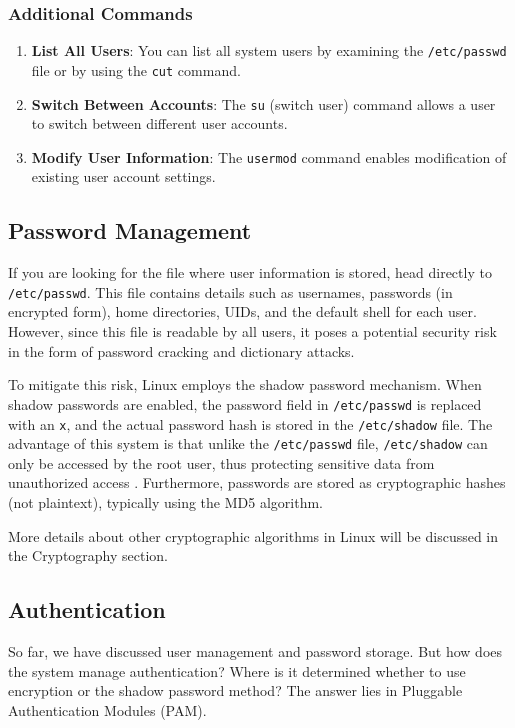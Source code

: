 \documentclass[conference]{IEEEtran}
\begin{document}
\subsubsection{Additional Commands}

\begin{enumerate}
    \item \textbf{List All Users}: You can list all system users by examining the \texttt{/etc/passwd} file or by using the \texttt{cut} command.
    \item \textbf{Switch Between Accounts}: The \texttt{su} (switch user) command allows a user to switch between different user accounts.
    \item \textbf{Modify User Information}: The \texttt{usermod} command enables modification of existing user account settings.
\end{enumerate}

\subsection{Password Management}

If you are looking for the file where user information is stored, head directly to \texttt{/etc/passwd}. This file contains details such as usernames, passwords (in encrypted form), home directories, UIDs, and the default shell for each user. However, since this file is readable by all users, it poses a potential security risk in the form of password cracking and dictionary attacks.

To mitigate this risk, Linux employs the shadow password mechanism. When shadow passwords are enabled, the password field in \texttt{/etc/passwd} is replaced with an \texttt{x}, and the actual password hash is stored in the \texttt{/etc/shadow} file. The advantage of this system is that unlike the \texttt{/etc/passwd} file, \texttt{/etc/shadow} can only be accessed by the root user, thus protecting sensitive data from unauthorized access \cite{tldp-authentication}. Furthermore, passwords are stored as cryptographic hashes (not plaintext), typically using the MD5 algorithm.

More details about other cryptographic algorithms in Linux will be discussed in the Cryptography section.

\subsection{Authentication}

So far, we have discussed user management and password storage. But how does the system manage authentication? Where is it determined whether to use encryption or the shadow password method? The answer lies in Pluggable Authentication Modules (PAM).
\end{document}
